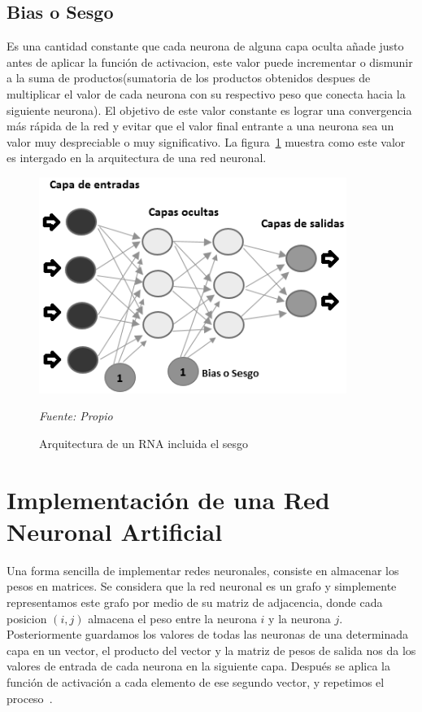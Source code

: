 \subsection{Bias o Sesgo}
Es una cantidad constante que cada neurona de alguna capa oculta añade justo antes de aplicar la función de activacion, este valor puede incrementar o dismunir a la suma de productos(sumatoria de los productos obtenidos despues de multiplicar el valor de cada neurona con su respectivo peso que conecta hacia la siguiente neurona). El objetivo de este valor constante es lograr una convergencia más rápida de la red y evitar que el valor final entrante a una neurona sea un valor muy despreciable o muy significativo. La figura~\ref{fig:arquitectura_red_neuronal} muestra como este valor es intergado en la arquitectura de una red neuronal.


\begin{figure}[H]
		\centering
		\includegraphics[width=100mm]{Imagenes/arquitectura_red_neuronal.png}
		\caption{Arquitectura de un RNA incluida el sesgo}
		\vspace{0.15cm}
		\textit{Fuente: Propio}
		\label{fig:arquitectura_red_neuronal}
\end{figure}

\section{Implementación de una Red Neuronal Artificial}
Una forma sencilla de implementar redes neuronales, consiste en almacenar los pesos en matrices. Se considera que la red neuronal es un grafo y simplemente representamos este grafo por medio de su matriz de adjacencia, donde cada posicion $(i,j)$ almacena el peso entre la neurona $i$ y la neurona $j$. Posteriormente guardamos los valores de todas las neuronas de una determinada capa en un vector, el producto del vector y la matriz de pesos de salida nos da los valores de entrada de cada neurona en la siguiente capa. Después se aplica la función de activación a cada elemento de ese segundo vector, y repetimos el proceso~\cite{21RedesNeuronales}.

